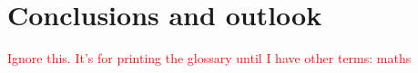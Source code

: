 \chapter{Conclusions and outlook}


\textcolor{red}{Ignore this. It's for printing the glossary until I have other terms: \gls{maths}}